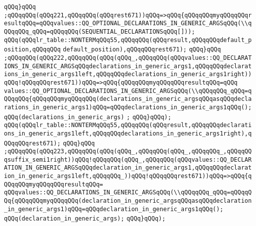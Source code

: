 \verb|qQQq}qQQq|\newline
\verb|;qQQqqQQq(qQQq221,qQQqqQQq(qQQqrest671))qQQq=>qQQq{qQQqqQQqmyqQQqqQQqresultqQQq=qQQqvalues::QQ_OPTIONAL_DECLARATIONS_IN_GENERIC_ARGSqQQq(\\qQQqqQQq_qQQq=qQQqqQQq(SEQUENTIAL_DECLARATIONSqQQq[]));|\newline
\verb|qQQq(qQQqlr_table::NONTERMqQQq55,qQQqqQQq(qQQqresult,qQQqqQQqdefault_position,qQQqqQQq|\newline
\verb|default_position),qQQqqQQqrest671);|\newline
\verb|qQQq}qQQq|\newline
\verb|;qQQqqQQq(qQQq222,qQQqqQQq(qQQq(qQQq_,qQQqqQQq(qQQqvalues::QQ_DECLARATIONS_IN_GENERIC_ARGSqQQqdeclarations_in_generic_args1,qQQqqQQqdeclarations_in_generic_args1left,qQQqqQQqdeclarations_in_generic_args1right))qQQq!qQQqqQQqrest671))qQQq=>qQQq{qQQqqQQqmyqQQqqQQqresultqQQq=qQQq|\newline
\verb|values::QQ_OPTIONAL_DECLARATIONS_IN_GENERIC_ARGSqQQq(\\qQQqqQQq_qQQq=qQQqqQQq{qQQqqQQqmyqQQqqQQq(declarations_in_generic_argsqQQqasqQQqdeclarations_in_generic_args1)qQQq=qQQqdeclarations_in_generic_args1qQQq();|\newline
\verb|qQQq(declarations_in_generic_args)|\newline
\verb|;|\newline
\verb|qQQq}qQQq);|\newline
\verb|qQQq(qQQqlr_table::NONTERMqQQq55,qQQqqQQq(qQQqresult,qQQqqQQqdeclarations_in_generic_args1left,qQQqqQQqdeclarations_in_generic_args1right),qQQqqQQqrest671);|\newline
\verb|qQQq}qQQq|\newline
\verb|;qQQqqQQq(qQQq223,qQQqqQQq(qQQq(qQQq_,qQQqqQQq(qQQq_,qQQqqQQq_,qQQqqQQqsuffix_semi1right))qQQq!qQQqqQQq(qQQq_,qQQqqQQq(qQQqvalues::QQ_DECLARATION_IN_GENERIC_ARGSqQQqdeclaration_in_generic_args1,qQQqqQQqdeclaration_in_generic_args1left,qQQqqQQq_))qQQq!qQQqqQQqrest671))qQQq=>qQQq{qQQqqQQqmyqQQqqQQqresultqQQq=|\newline
\verb|qQQqvalues::QQ_DECLARATIONS_IN_GENERIC_ARGSqQQq(\\qQQqqQQq_qQQq=qQQqqQQq{qQQqqQQqmyqQQqqQQq(declaration_in_generic_argsqQQqasqQQqdeclaration_in_generic_args1)qQQq=qQQqdeclaration_in_generic_args1qQQq();|\newline
\verb|qQQq(declaration_in_generic_args);|\newline
\verb|qQQq}qQQq);|\newline
